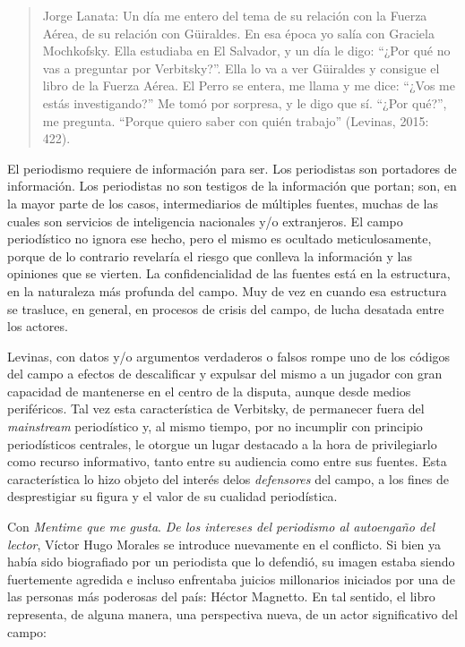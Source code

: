 {\begin{quote}
Jorge Lanata: Un día me entero del tema de su relación con la Fuerza Aérea, de su relación con Güiraldes. En esa época yo salía con Graciela Mochkofsky. Ella estudiaba en El Salvador, y un día le digo: ``¿Por qué no vas a preguntar por Verbitsky?''. Ella lo va a ver Güiraldes y consigue el libro de la Fuerza Aérea. El Perro se entera, me llama y me dice: ``¿Vos me estás investigando?'' Me tomó por sorpresa, y le digo que sí. ``¿Por qué?'', me pregunta. ``Porque quiero saber con quién trabajo'' (Levinas, 2015: 422).
\end{quote}

El periodismo requiere de información para ser. Los periodistas son portadores de información. Los periodistas no son testigos de la información que portan; son, en la mayor parte de los casos, intermediarios de múltiples fuentes, muchas de las cuales son servicios de inteligencia nacionales y/o extranjeros. El campo periodístico no ignora ese hecho, pero el mismo es ocultado meticulosamente, porque de lo contrario revelaría el riesgo que conlleva la información y las opiniones que se vierten. La confidencialidad de las fuentes está en la estructura, en la naturaleza más profunda del campo. Muy de vez en cuando esa estructura se trasluce, en general, en procesos de crisis del campo, de lucha desatada entre los actores.

Levinas, con datos y/o argumentos verdaderos o falsos rompe uno de los códigos del campo a efectos de descalificar y expulsar del mismo a un jugador con gran capacidad de mantenerse en el centro de la disputa, aunque desde medios periféricos. Tal vez esta característica de Verbitsky, de permanecer fuera del \emph{mainstream} periodístico y, al mismo tiempo, por no incumplir con principio periodísticos centrales, le otorgue un lugar destacado a la hora de privilegiarlo como recurso informativo, tanto entre su audiencia como entre sus fuentes. Esta característica lo hizo objeto del interés delos \emph{defensores} del campo, a los fines de desprestigiar su figura y el valor de su cualidad periodística.

Con \emph{Mentime que me gusta}. \emph{De los intereses del periodismo al autoengaño del lector}, Víctor Hugo Morales se introduce nuevamente en el conflicto. Si bien ya había sido biografiado por un periodista que lo defendió, su imagen estaba siendo fuertemente agredida e incluso enfrentaba juicios millonarios iniciados por una de las personas más poderosas del país: Héctor Magnetto. En tal sentido, el libro representa, de alguna manera, una perspectiva nueva, de un actor significativo del campo:

}

